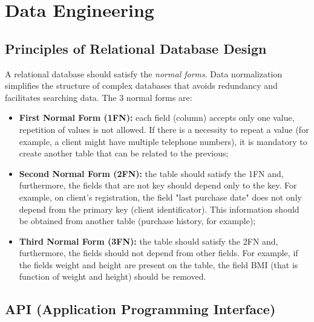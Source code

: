 
\chapter{Data Engineering} %

\label{ChapterX} %


\section{Principles of Relational Database Design}
A relational database should satisfy the \textit{normal forms}. Data normalization simplifies the structure of complex databases that avoids redundancy and facilitates searching data. The 3 normal forms are:
    
    \begin{itemize}
        \item \textbf{First Normal Form (1FN):} each field (column) accepts only one value, repetition of values is not allowed. If there is a necessity to repeat a value (for example, a client might have multiple telephone numbers), it is mandatory to create another table that can be related to the previous;
        
        \item \textbf{Second Normal Form (2FN):} the table should satisfy the 1FN and, furthermore, the fields that are not key should depend only to the key. For example, on client's registration, the field "last purchase date" does not only depend from the primary key (client identificator). This information should be obtained from another table (purchase history, for example);
        
        \item \textbf{Third Normal Form (3FN):} the table should satisfy the 2FN and, furthermore, the fields should not depend from other fields. For example, if the fields weight and height are present on the table, the field BMI (that is function of weight and height) should be removed.
        
\end{itemize}

\section{API (Application Programming Interface)}

